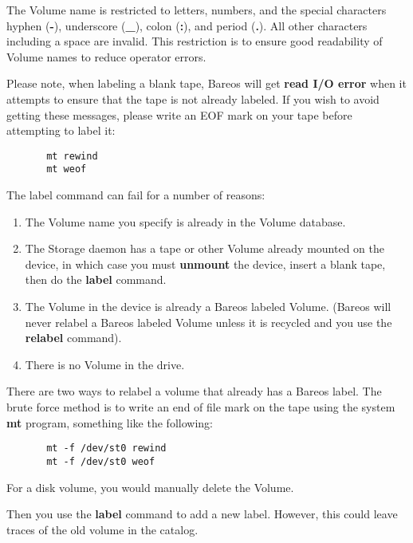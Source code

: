 \begin{description}
{   The Volume name is restricted to letters, numbers, and the special
   characters hyphen ({\bf -}), underscore ({\bf \_}), colon ({\bf :}), and
   period ({\bf .}).  All other characters including a space are invalid.
   This restriction is to ensure good readability of Volume names to reduce
   operator errors.

   Please note, when labeling a blank tape, Bareos will get {\bf read I/O
   error} when it attempts to ensure that the tape is not already labeled.  If
   you wish to avoid getting these messages, please write an EOF mark on
   your tape before attempting to label it:

\footnotesize
\begin{verbatim}
       mt rewind
       mt weof
\end{verbatim}
\normalsize

The label command can fail for a number of reasons:

\begin{enumerate}
\item The Volume name you specify is already in the  Volume database.

\item The Storage daemon has a tape or other Volume already mounted on the
   device, in which case you must {\bf unmount} the device, insert a blank
   tape, then do the {\bf label} command.

\item The Volume in the device is already a Bareos labeled Volume.  (Bareos will
   never relabel a Bareos labeled Volume unless it is recycled and you use the
   {\bf relabel} command).

\item There is no Volume in the drive.
\end{enumerate}

There are two ways to relabel a volume that already has a Bareos label. The
brute  force method is to write an end of file mark on the tape  using the
system {\bf mt} program, something like the  following:

\footnotesize
\begin{verbatim}
       mt -f /dev/st0 rewind
       mt -f /dev/st0 weof
\end{verbatim}
\normalsize

For a disk volume, you would manually delete the Volume.

Then you use the {\bf label} command to add a new label.  However, this could
leave traces of the old volume in the  catalog.

}
\end{description}
